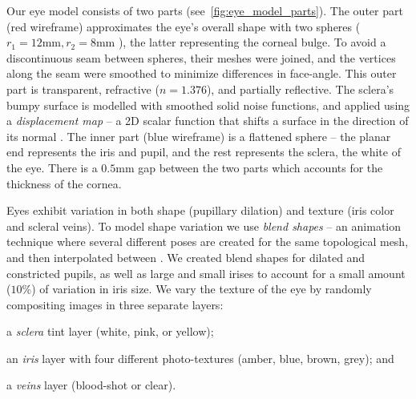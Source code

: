 


Our eye model consists of two parts (see~\autoref{fig:eye_model_parts}).
The outer part (red wireframe) approximates the eye's overall shape with two spheres ($r_1\!=\!12\textrm{mm}, r_2\!=\!8\textrm{mm}$ \cite{ruhland2014look}), the latter representing the corneal bulge.
To avoid a discontinuous seam between spheres, their meshes were joined, and the vertices along the seam were smoothed to minimize differences in face-angle.
This outer part is transparent, refractive ($n\!=\!1.376$), and partially reflective.
The sclera's bumpy surface is modelled with smoothed solid noise functions, and applied using a \emph{displacement map} -- a 2D scalar function that shifts a surface in the direction of its normal \cite{lee2000displaced}.
The inner part (blue wireframe) is a flattened sphere  -- the planar end represents the iris and pupil, and the rest represents the sclera, the white of the eye.
There is a $0.5\textrm{mm}$ gap between the two parts which accounts for the thickness of the cornea.

Eyes exhibit variation in both shape (pupillary dilation) and texture (iris color and scleral veins).
To model shape variation we use \emph{blend shapes} -- an animation technique where several different poses are created for the same topological mesh, and then interpolated between \cite{orvalho2012facial}. 
We created blend shapes for dilated and constricted pupils, as well as large and small irises to account for a small amount ($10\%$) of variation in iris size.
We vary the texture of the eye by randomly compositing images in three separate layers:
\begin{inparaenum}
\item a \emph{sclera} tint layer (white, pink, or yellow);
\item an \emph{iris} layer with four different photo-textures (amber, blue, brown, grey); and
\item a \emph{veins} layer (blood-shot or clear).
\end{inparaenum}

